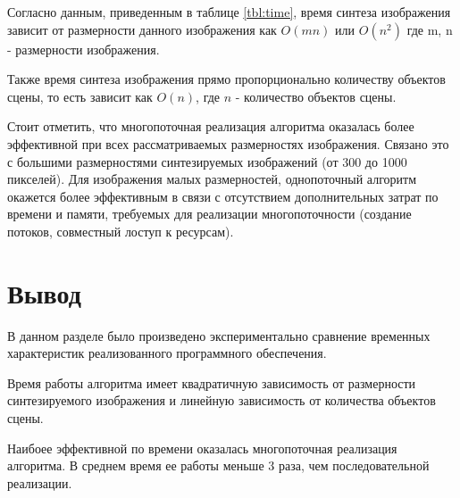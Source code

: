         Согласно данным, приведенным в таблице \ref{tbl:time}, время синтеза изображения зависит от размерности данного изображения как $O(m n)$ или $O(n^2)$ где m, n - размерности изображения.
        
        Также время синтеза изображения прямо пропорционально количеству объектов сцены, то есть зависит как $O(n)$, где $n$ - количество объектов сцены.

        Стоит отметить, что многопоточная реализация алгоритма оказалась  более эффективной при всех рассматриваемых размерностях изображения. Связано это с большими размерностями синтезируемых изображений (от 300 до 1000 пикселей). Для изображения малых размерностей, однопоточный алгоритм окажется более эффективным в связи с отсутствием дополнительных затрат по времени и памяти, требуемых для реализации многопоточности (создание потоков, совместный лоступ к ресурсам).

    \section{Вывод}

        В данном разделе было произведено экспериментально сравнение временных характеристик реализованного программного обеспечения.
        
        Время работы алгоритма имеет квадратичную зависимость от размерности синтезируемого изображения и линейную зависимость от количества объектов сцены.
        
        Наибоее эффективной по времени оказалась многопоточная реализация алгоритма. В среднем время ее работы меньше 3 раза, чем последовательной реализации.